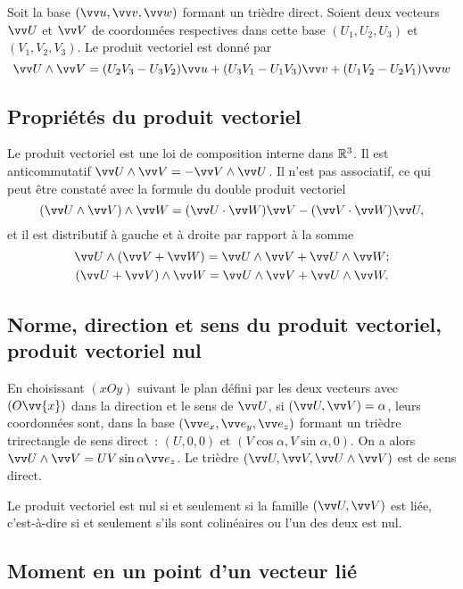 Soit la base $(\vu,\vvv,\vw)$ formant un trièdre direct. Soient deux vecteurs $\vU$ et $\vV$ de coordonnées respectives dans cette base $(U_1,U_2,U_3)$ et $(V_1,V_2,V_3)$. Le produit vectoriel est donné par
\begin{equation}
  \vU \wedge \vV = (U_2V_3-U_3V_2) \vu + (U_3V_1-U_1V_3) \vvv + (U_1V_2-U_2V_1) \vw
\end{equation}

\subsection{Propriétés du produit vectoriel}
\label{chap1-subsec:propprodvec}

Le produit vectoriel est une loi de composition interne dans $\mathbb{R}^3$. Il est anticommutatif $\vU\wedge\vV=-\vV\wedge\vU$. Il n'est pas associatif, ce qui peut être constaté avec la formule du double produit vectoriel
\begin{equation}
  \label{eq:doubleproduitvectoriel}
  (\vU\wedge\vV)\wedge\vW=(\vU\cdot\vW)\vV-(\vV\cdot\vW)\vU,
\end{equation}
et il est distributif à gauche et à droite par rapport à la somme
\begin{gather}
  \vU\wedge(\vV+\vW)= \vU\wedge\vV + \vU\wedge\vW;\\
  (\vU+\vV)\wedge\vW = \vU\wedge\vV + \vU\wedge\vW.
\end{gather}

\subsection{Norme, direction et sens du produit vectoriel, produit vectoriel nul}
\label{chap1-sec:normedirectionetsensproduitvectoriel}

En choisissant $(xOy)$ suivant le plan défini par les deux vecteurs avec $(O\vv{x})$ dans la direction et le sens de $\vU$, si $(\vU,\vV)=\alpha$, leurs coordonnées sont, dans la base $(\ex,\ey,\ez)$ formant un trièdre trirectangle de sens direct~: $(U,0,0)$ et $(V\cos\alpha,V\sin\alpha,0)$. On a alors $\vU\wedge\vV = UV\sin\alpha\ez$. Le trièdre $(\vU,\vV,\vU\wedge\vV)$ est de sens direct.

Le produit vectoriel est nul si et seulement si la famille $(\vU,\vV)$ est liée, c'est-à-dire si et seulement s'ils sont colinéaires ou l'un des deux est nul.

\subsection{Moment en un point d'un vecteur lié}
\label{chap1-sec:momentenunpointdunvecteurlié}

